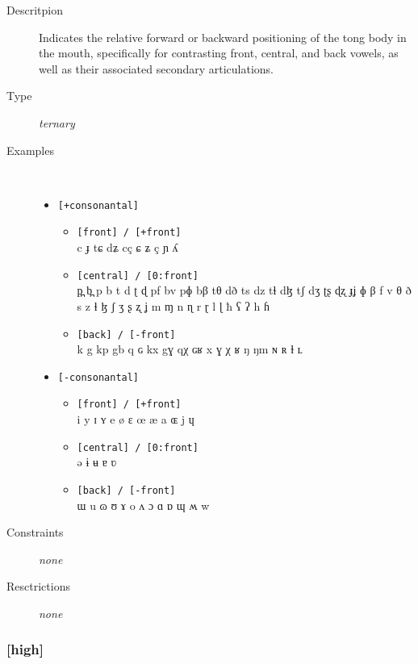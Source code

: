 \documentclass[10pt,letterpaper]{article}
\begin{document}
\begin{description}
\item[Descritpion] Indicates the relative forward or backward positioning of the tong body in the mouth, specifically for contrasting front, central, and back vowels, as well as their associated secondary articulations.
\item[Type] \emph{ternary}
\item[Examples]\
  \begin{itemize}
    \item \texttt{[+consonantal]}
    \begin{itemize}
      \item \texttt{[front] / [+front]}\\
      c ɟ tɕ dʑ cç ɕ ʑ ç ɲ ʎ 
      \item \texttt{[central] / [0:front]}\\
      p̪ b̪ p b t d ʈ ɖ pf bv pɸ bβ tθ dð ts dz tɬ dɮ tʃ dʒ ʈʂ ɖʐ ɟʝ ɸ β f v θ ð s z ɬ ɮ ʃ ʒ ʂ ʐ ʝ m ɱ n ɳ r ɽ l ɭ ħ ʕ ʔ h ɦ 
      \item \texttt{[back] / [-front]}\\
      k g kp gb q ɢ kx gɣ qχ ɢʁ x ɣ χ ʁ ŋ ŋm ɴ ʀ ɫ ʟ 
    \end{itemize}
    \item  \texttt{[-consonantal]}
    \begin{itemize}
      \item \texttt{[front] / [+front]}\\
      i y ɪ ʏ e ø ɛ œ æ a ɶ j ɥ 
      \item \texttt{[central] / [0:front]}\\
      ə ɨ ʉ ɐ ʋ 
      \item \texttt{[back] / [-front]}\\
      ɯ u ɷ ʊ ɤ o ʌ ɔ ɑ ɒ ɰ ʍ w 
    \end{itemize}
  \end{itemize}
\item[Constraints] \emph{none}
\item[Resctrictions] \emph{none}
\end{description}

\subsubsection{[high]}
\label{ssub:feature_high}
\end{document}

